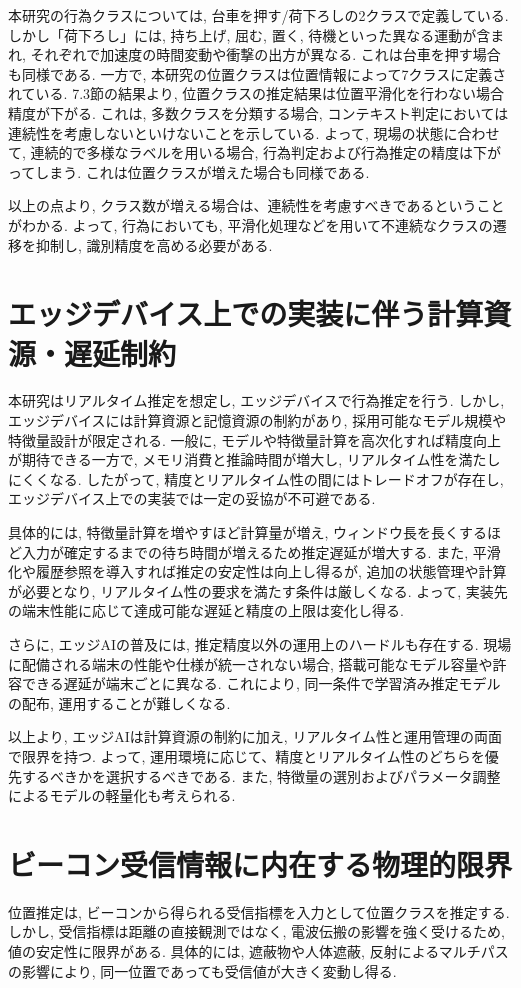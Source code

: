 \documentclass[a4paper,12pt]{jreport}
\begin{document}
本研究の行為クラスについては, 台車を押す/荷下ろしの2クラスで定義している. しかし「荷下ろし」には, 持ち上げ, 屈む, 置く, 待機といった異なる運動が含まれ, それぞれで加速度の時間変動や衝撃の出方が異なる. これは台車を押す場合も同様である. 一方で, 本研究の位置クラスは位置情報によって7クラスに定義されている. 7.3節の結果より, 位置クラスの推定結果は位置平滑化を行わない場合精度が下がる. これは, 多数クラスを分類する場合, コンテキスト判定においては連続性を考慮しないといけないことを示している. よって, 現場の状態に合わせて, 連続的で多様なラベルを用いる場合, 行為判定および行為推定の精度は下がってしまう. これは位置クラスが増えた場合も同様である. 

以上の点より, クラス数が増える場合は、連続性を考慮すべきであるということがわかる. よって, 行為においても, 平滑化処理などを用いて不連続なクラスの遷移を抑制し, 識別精度を高める必要がある. 

\section{エッジデバイス上での実装に伴う計算資源・遅延制約}
本研究はリアルタイム推定を想定し, エッジデバイスで行為推定を行う. しかし, エッジデバイスには計算資源と記憶資源の制約があり, 採用可能なモデル規模や特徴量設計が限定される. 一般に, モデルや特徴量計算を高次化すれば精度向上が期待できる一方で, メモリ消費と推論時間が増大し, リアルタイム性を満たしにくくなる. したがって, 精度とリアルタイム性の間にはトレードオフが存在し, エッジデバイス上での実装では一定の妥協が不可避である. 

具体的には, 特徴量計算を増やすほど計算量が増え, ウィンドウ長を長くするほど入力が確定するまでの待ち時間が増えるため推定遅延が増大する. また, 平滑化や履歴参照を導入すれば推定の安定性は向上し得るが, 追加の状態管理や計算が必要となり, リアルタイム性の要求を満たす条件は厳しくなる. よって, 実装先の端末性能に応じて達成可能な遅延と精度の上限は変化し得る. 

さらに, エッジAIの普及には, 推定精度以外の運用上のハードルも存在する. 現場に配備される端末の性能や仕様が統一されない場合, 搭載可能なモデル容量や許容できる遅延が端末ごとに異なる. これにより, 同一条件で学習済み推定モデルの配布, 運用することが難しくなる. 

以上より, エッジAIは計算資源の制約に加え, リアルタイム性と運用管理の両面で限界を持つ. よって, 運用環境に応じて、精度とリアルタイム性のどちらを優先するべきかを選択するべきである. また, 特徴量の選別およびパラメータ調整によるモデルの軽量化も考えられる. 

\section{ビーコン受信情報に内在する物理的限界}
位置推定は, ビーコンから得られる受信指標を入力として位置クラスを推定する. しかし, 受信指標は距離の直接観測ではなく, 電波伝搬の影響を強く受けるため, 値の安定性に限界がある. 具体的には, 遮蔽物や人体遮蔽, 反射によるマルチパスの影響により, 同一位置であっても受信値が大きく変動し得る. 
\end{document}
